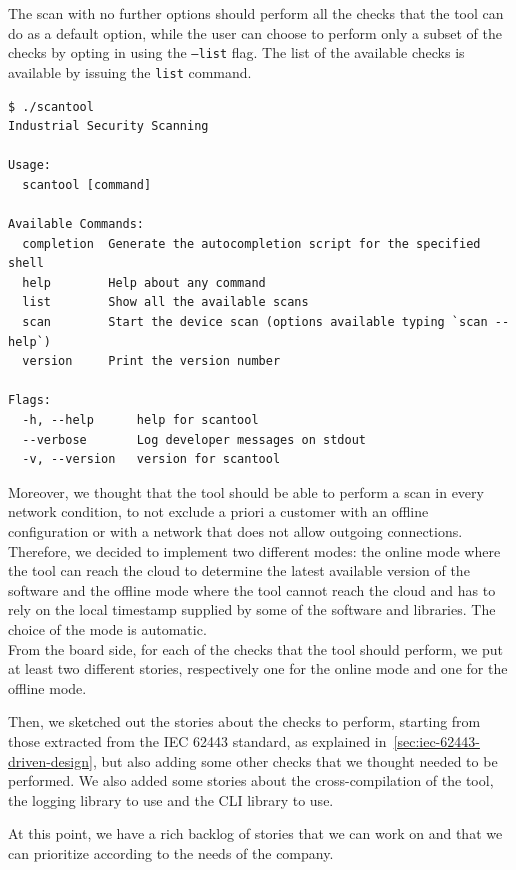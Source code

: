 The scan with no further options should perform all the checks that the tool can do as a default option, while the user can choose to perform only a subset of the checks by opting in using the \texttt{--list} flag. The list of the available checks is available by issuing the \texttt{list} command.

\noindent\begin{minipage}{\linewidth}
  \vspace{0.5cm}
  \begin{lstlisting}[caption={Man page}]
$ ./scantool
Industrial Security Scanning

Usage:
  scantool [command]

Available Commands:
  completion  Generate the autocompletion script for the specified shell
  help        Help about any command
  list        Show all the available scans
  scan        Start the device scan (options available typing `scan --help`)
  version     Print the version number

Flags:
  -h, --help      help for scantool
  --verbose       Log developer messages on stdout
  -v, --version   version for scantool
\end{lstlisting}
\end{minipage}

Moreover, we thought that the tool should be able to perform a scan in every network condition, to not exclude a priori a customer with an offline configuration or with a network that does not allow outgoing connections. Therefore, we decided to implement two different modes: the online mode where the tool can reach the cloud to determine the latest available version of the software and the offline mode where the tool cannot reach the cloud and has to rely on the local timestamp supplied by some of the software and libraries. The choice of the mode is automatic. \\
From the board side, for each of the checks that the tool should perform, we put at least two different stories, respectively one for the online mode and one for the offline mode.

Then, we sketched out the stories about the checks to perform, starting from those extracted from the IEC 62443 standard, as explained in~\cref{sec:iec-62443-driven-design}, but also adding some other checks that we thought needed to be performed. We also added some stories about the cross-compilation of the tool, the logging library to use and the CLI library to use.

At this point, we have a rich backlog of stories that we can work on and that we can prioritize according to the needs of the company.

